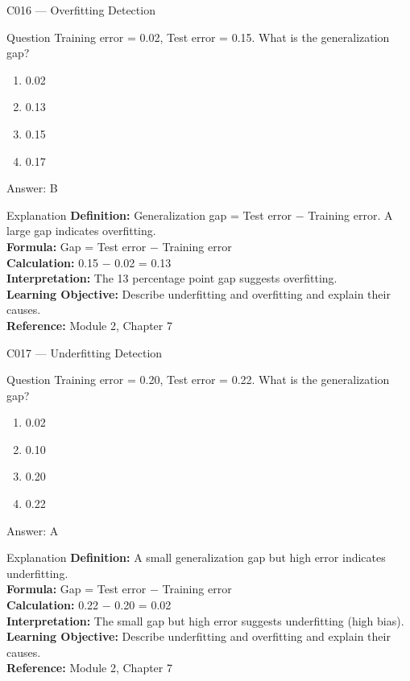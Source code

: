 \documentclass[aspectratio=169,8pt]{beamer}
\begin{document}
	\begin{frame}{C016 --- Overfitting Detection}
		\begin{block}{Question}
			Training error = 0.02, Test error = 0.15. What is the generalization gap?
			\begin{enumerate}
				\item 0.02
				\item 0.13
				\item 0.15
				\item 0.17
			\end{enumerate}
		\end{block}
		\begin{exampleblock}{Answer: B}\end{exampleblock}
		\begin{block}{Explanation}
			\textbf{Definition:} Generalization gap = Test error $-$ Training error. A large gap indicates overfitting.\\
			\textbf{Formula:} Gap = Test error $-$ Training error\\
			\textbf{Calculation:} 0.15 $-$ 0.02 = 0.13\\
			\textbf{Interpretation:} The 13 percentage point gap suggests overfitting.\\
			\textbf{Learning Objective:} Describe underfitting and overfitting and explain their causes.\\
			\textbf{Reference:} Module 2, Chapter 7
		\end{block}
	\end{frame}
	
	\begin{frame}{C017 --- Underfitting Detection}
		\begin{block}{Question}
			Training error = 0.20, Test error = 0.22. What is the generalization gap?
			\begin{enumerate}
				\item 0.02
				\item 0.10
				\item 0.20
				\item 0.22
			\end{enumerate}
		\end{block}
		\begin{exampleblock}{Answer: A}\end{exampleblock}
		\begin{block}{Explanation}
			\textbf{Definition:} A small generalization gap but high error indicates underfitting.\\
			\textbf{Formula:} Gap = Test error $-$ Training error\\
			\textbf{Calculation:} 0.22 $-$ 0.20 = 0.02\\
			\textbf{Interpretation:} The small gap but high error suggests underfitting (high bias).\\
			\textbf{Learning Objective:} Describe underfitting and overfitting and explain their causes.\\
			\textbf{Reference:} Module 2, Chapter 7
		\end{block}
	\end{frame}
	
\end{document}
